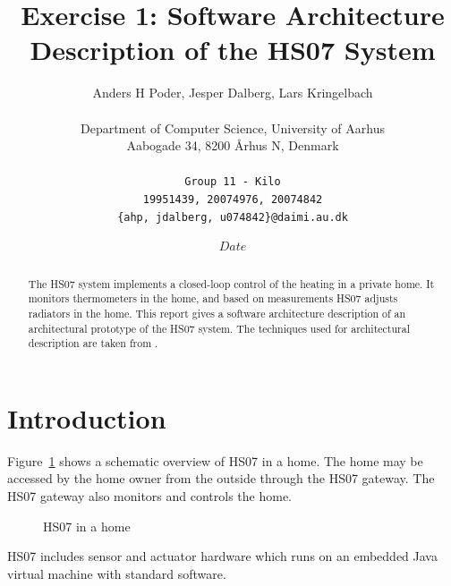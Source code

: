 \documentclass[a4paper,10pt]{article}
\begin{document}
\title{Exercise 1: Software Architecture Description of the HS07 System}

\author{
  Anders H Poder, Jesper Dalberg, Lars Kringelbach\\\\
  Department of Computer Science, University of Aarhus\\
  Aabogade 34, 8200 {\AA}rhus N, Denmark\\\\
  \makeatletter
  \texttt{Group 11 - Kilo}\\
  \texttt{19951439, 20074976, 20074842}\\
  \texttt{\{ahp, jdalberg, u074842\}@daimi.au.dk}
}

\date{$Date$}

\maketitle

\begin{abstract}
  The HS07 system implements a closed-loop control of the heating in a
  private home. It monitors thermometers in the home, and based on
  measurements HS07 adjusts radiators in the home. This report gives a
  software architecture description of an architectural prototype of
  the HS07 system. The techniques used for architectural description
  are taken from \cite{christensen2004archdesc}.
\end{abstract}

\section{Introduction}

Figure~\ref{fig:hs07} shows a schematic overview of HS07 in a
home. The home may be accessed by the home owner from the outside
through the HS07 gateway. The HS07 gateway also monitors and controls
the home.
\begin{figure}[!htb]
\centerline{}
\caption{HS07 in a home}
\label{fig:hs07}
\end{figure}

HS07 includes sensor and actuator hardware which runs on an embedded Java virtual
machine with standard software.

\end{document}
